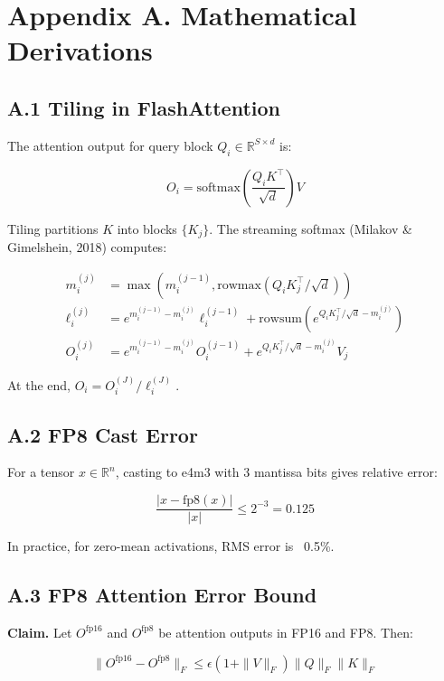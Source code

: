 
\section{Appendix A. Mathematical Derivations}

\subsection{A.1 Tiling in FlashAttention}

The attention output for query block $Q_i \in \mathbb{R}^{S \times d}$ is:

\[
O_i = \text{softmax}\!\left(\frac{Q_i K^\top}{\sqrt{d}}\right) V
\tag{A.1}
\]

Tiling partitions $K$ into blocks $\{K_j\}$. The streaming softmax (Milakov 
\& Gimelshein, 2018) computes:

\[
\begin{aligned}
m_i^{(j)} &= \max(m_i^{(j-1)}, \text{rowmax}(Q_i K_j^\top / \sqrt{d})) \\
\ell_i^{(j)} &= e^{m_i^{(j-1)} - m_i^{(j)}} \ell_i^{(j-1)} 
              + \text{rowsum}(e^{Q_i K_j^\top / \sqrt{d} - m_i^{(j)}}) \\
O_i^{(j)} &= e^{m_i^{(j-1)} - m_i^{(j)}} O_i^{(j-1)} 
          + e^{Q_i K_j^\top / \sqrt{d} - m_i^{(j)}} V_j
\end{aligned}
\tag{A.2}
\]

At the end, $O_i = O_i^{(J)} / \ell_i^{(J)}$.

\subsection{A.2 FP8 Cast Error}

For a tensor $x \in \mathbb{R}^n$, casting to e4m3 with 3 mantissa bits gives 
relative error:

\[
\frac{|x - \text{fp8}(x)|}{|x|} \leq 2^{-3} = 0.125
\tag{A.3}
\]

In practice, for zero-mean activations, RMS error is ~0.5\%.

\subsection{A.3 FP8 Attention Error Bound}

\textbf{Claim.} Let $O^\text{fp16}$ and $O^\text{fp8}$ be attention outputs in 
FP16 and FP8. Then:

\[
\|O^\text{fp16} - O^\text{fp8}\|_F \leq \epsilon (1 + \|V\|_F) \|Q\|_F \|K\|_F
\tag{A.4}
\]

